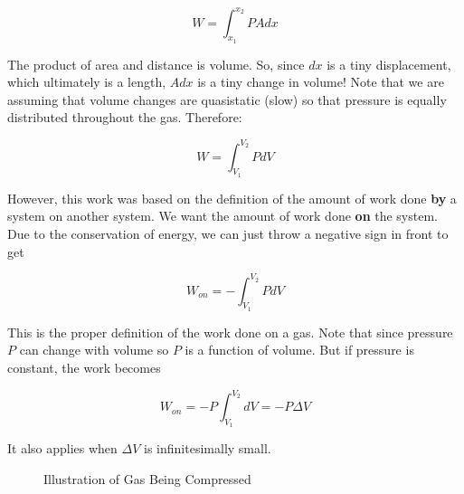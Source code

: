 \documentclass[12pt, a4paper]{article}
\begin{document}
$$W = \int_{x_1}^{x_2} PAdx$$

The product of area and distance is volume. So, since $dx$ is a tiny displacement, which ultimately is a length, $Adx$ is a tiny change in volume! Note that we are assuming that volume changes are quasistatic (slow) so that pressure is equally distributed throughout the gas. Therefore:

$$W = \int_{V_1}^{V_2} PdV$$

However, this work was based on the definition of the amount of work done \textbf{by} a system on another system. We want the amount of work done \textbf{on} the system. Due to the conservation of energy, we can just throw a negative sign in front to get

$$W_{on} = -\int_{V_1}^{V_2} PdV$$

This is the proper definition of the work done on a gas. Note that since pressure $P$ can change with volume so $P$ is a function of volume. But if pressure is constant, the work becomes

$$ W_{on} = -P\int_{V_1}^{V_2}dV = -P \Delta V$$

It also applies when $\Delta V$ is infinitesimally small.

\begin{figure}[H]
    \centering
    \caption{Illustration of Gas Being Compressed}
\end{figure}
\end{document}
